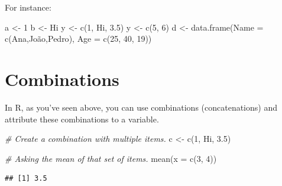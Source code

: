 \documentclass[
]{book}
\newenvironment{Shaded}{\begin{snugshade}}{\end{snugshade}}
\newcommand{\AttributeTok}[1]{\textcolor[rgb]{0.77,0.63,0.00}{#1}}
\newcommand{\CommentTok}[1]{\textcolor[rgb]{0.56,0.35,0.01}{\textit{#1}}}
\newcommand{\DecValTok}[1]{\textcolor[rgb]{0.00,0.00,0.81}{#1}}
\newcommand{\FloatTok}[1]{\textcolor[rgb]{0.00,0.00,0.81}{#1}}
\newcommand{\FunctionTok}[1]{\textcolor[rgb]{0.00,0.00,0.00}{#1}}
\newcommand{\NormalTok}[1]{#1}
\newcommand{\OtherTok}[1]{\textcolor[rgb]{0.56,0.35,0.01}{#1}}
\newcommand{\StringTok}[1]{\textcolor[rgb]{0.31,0.60,0.02}{#1}}
\begin{document}
For instance:

\begin{Shaded}
\begin{Highlighting}[]
\NormalTok{a }\OtherTok{\textless{}{-}} \DecValTok{1}
\NormalTok{b }\OtherTok{\textless{}{-}} \StringTok{\textquotesingle{}Hi\textquotesingle{}}
\NormalTok{y }\OtherTok{\textless{}{-}} \FunctionTok{c}\NormalTok{(}\DecValTok{1}\NormalTok{, }\StringTok{\textquotesingle{}Hi\textquotesingle{}}\NormalTok{, }\FloatTok{3.5}\NormalTok{)}
\NormalTok{y }\OtherTok{\textless{}{-}} \FunctionTok{c}\NormalTok{(}\DecValTok{5}\NormalTok{, }\DecValTok{6}\NormalTok{)}
\NormalTok{d }\OtherTok{\textless{}{-}} \FunctionTok{data.frame}\NormalTok{(}\StringTok{\textquotesingle{}Name\textquotesingle{}} \OtherTok{=} \FunctionTok{c}\NormalTok{(}\StringTok{\textquotesingle{}Ana\textquotesingle{}}\NormalTok{,}\StringTok{\textquotesingle{}João\textquotesingle{}}\NormalTok{,}\StringTok{\textquotesingle{}Pedro\textquotesingle{}}\NormalTok{), }\StringTok{\textquotesingle{}Age\textquotesingle{}} \OtherTok{=} \FunctionTok{c}\NormalTok{(}\DecValTok{25}\NormalTok{, }\DecValTok{40}\NormalTok{, }\DecValTok{19}\NormalTok{))}
\end{Highlighting}
\end{Shaded}

\hypertarget{combinations}{%
\section{Combinations}\label{combinations}}

In R, as you've seen above, you can use combinations (concatenations) and attribute these combinations to a variable.

\begin{Shaded}
\begin{Highlighting}[]
\CommentTok{\# Create a combination with multiple items.}
\NormalTok{c }\OtherTok{\textless{}{-}} \FunctionTok{c}\NormalTok{(}\DecValTok{1}\NormalTok{, }\StringTok{\textquotesingle{}Hi\textquotesingle{}}\NormalTok{, }\FloatTok{3.5}\NormalTok{)}

\CommentTok{\# Asking the mean of that set of items.}
\FunctionTok{mean}\NormalTok{(}\AttributeTok{x =} \FunctionTok{c}\NormalTok{(}\DecValTok{3}\NormalTok{, }\DecValTok{4}\NormalTok{))}
\end{Highlighting}
\end{Shaded}

\begin{verbatim}
## [1] 3.5
\end{verbatim}
\end{document}
